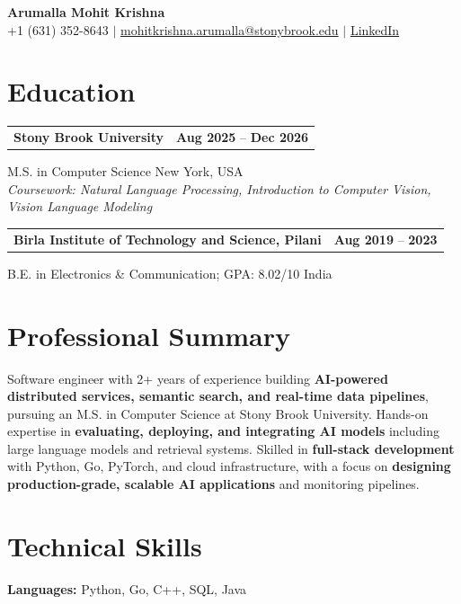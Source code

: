 \documentclass[letterpaper,10pt]{article}
\makeatletter
\newcommand{\entry}[2]{%
  \noindent
  \begin{tabularx}{\linewidth}
    {@{}>{\raggedright\arraybackslash}X@{\hspace{6pt}}r@{}}
    \textbf{#1} & #2
  \end{tabularx}\par
}
\makeatother
\begin{document}
\begin{center}
    {\LARGE\bfseries Arumalla Mohit Krishna}\\[3pt]
    +1 (631) 352-8643 $|$
    \href{mailto:mohitkrishna.arumalla@stonybrook.edu}
    {mohitkrishna.arumalla@stonybrook.edu} $|$
    \href{https://linkedin.com/in/mohit-krishna-arumalla}
    {LinkedIn}
\end{center}
\vspace{-8pt}

\section{Education}

\entry
  {Stony Brook University}
  {\textbf{Aug 2025} -- \textbf{Dec 2026}}

M.S. in Computer Science \hfill New York, USA\\
\textit{
Coursework: Natural Language Processing,
Introduction to Computer Vision, Vision Language Modeling
}
\vspace{3pt}

\entry
  {Birla Institute of Technology and Science, Pilani}
  {\textbf{Aug 2019} -- \textbf{2023}}

B.E. in Electronics \& Communication; GPA: 8.02/10 \hfill India

\section{Professional Summary}

Software engineer with 2+ years of experience building \textbf{AI-powered distributed services, semantic search, and real-time data pipelines}, pursuing an M.S. in Computer Science at Stony Brook University. Hands-on expertise in \textbf{evaluating, deploying, and integrating AI models} including large language models and retrieval systems. Skilled in \textbf{full-stack development} with Python, Go, PyTorch, and cloud infrastructure, with a focus on \textbf{designing production-grade, scalable AI applications} and monitoring pipelines.

\section{Technical Skills}

\textbf{Languages:}
Python, Go, C++, SQL, Java\\
\end{document}
